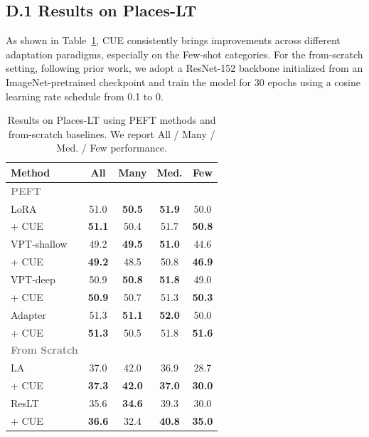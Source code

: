 \subsection*{D.1 Results on Places-LT}
 As shown in Table~\ref{tab:places_peft_scratch}, CUE consistently brings improvements across different adaptation paradigms, especially on the Few-shot categories. For the from-scratch setting, following prior work\cite{kang2020decoupling,cui2022reslt}, we adopt a ResNet-152 backbone initialized from an ImageNet-pretrained checkpoint and train the model for 30 epochs using a cosine learning rate schedule from 0.1 to 0.

\begin{table}[h]
\centering
\caption{Results on Places-LT using PEFT methods and from-scratch baselines. 
We report All / Many / Med. / Few performance.}
\label{tab:places_peft_scratch}
\small
\begin{tabular}{l|cccc}
\toprule
\textbf{Method} & \textbf{All} & \textbf{Many} & \textbf{Med.} & \textbf{Few} \\
\midrule
\textcolor{gray}{\textbf{PEFT}} & & & & \\
\quad 
LoRA~\cite{hu2022lora} &51.0 & \textbf{50.5}	&\textbf{51.9}	&50.0	  \\
\quad + CUE & \textbf{51.1} & 50.4	&51.7	&\textbf{50.8}	\\
\quad VPT-shallow~\cite{jia2022visual} & 49.2 & \textbf{49.5} &	\textbf{51.0}	& 44.6	  \\
\quad + CUE & \textbf{49.2} & 48.5 &	50.8 & \textbf{46.9}  \\
\quad VPT-deep~\cite{jia2022visual} & 50.9 & \textbf{50.8}	& \textbf{51.8} &49.0	  \\
\quad + CUE & \textbf{50.9} &50.7	&51.3	&\textbf{50.3}	  \\
\quad 
Adapter~\cite{houlsby2019parameter} & 51.3& \textbf{51.1}&	\textbf{52.0}&	50.0	 \\
\quad + CUE & \textbf{51.3} & 50.5 &	51.8	& \textbf{51.6}	 \\[3pt]
\midrule
\textcolor{gray}{\textbf{From Scratch}} & & & & \\
\quad LA~\cite{menon2021longtail} & 37.0 & 42.0 & 36.9 & 28.7 \\
\textbf{}\quad + CUE & \textbf{37.3}  & \textbf{42.0}  & \textbf{37.0} & \textbf{30.0} \\
\quad ResLT~\cite{cui2022reslt} & 35.6 & \textbf{34.6} & 39.3 & 30.0 \\
\quad + CUE & \textbf{36.6}  & 32.4 & \textbf{40.8} & \textbf{35.0} \\
\bottomrule
\end{tabular}
\vspace{-1em}
\end{table}



